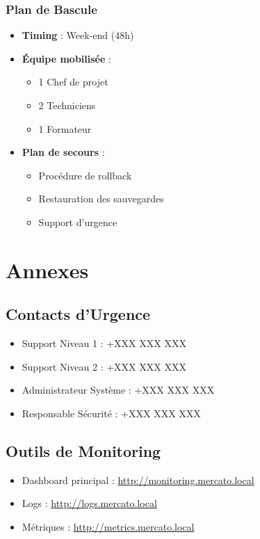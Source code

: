 \documentclass[14pt,a4paper]{report}
\begin{document}
\subsection{Plan de Bascule}
\begin{itemize}
    \item \textbf{Timing} : Week-end (48h)
    \item \textbf{Équipe mobilisée} :
        \begin{itemize}
            \item 1 Chef de projet
            \item 2 Techniciens
            \item 1 Formateur
        \end{itemize}
    \item \textbf{Plan de secours} :
        \begin{itemize}
            \item Procédure de rollback
            \item Restauration des sauvegardes
            \item Support d'urgence
        \end{itemize}
\end{itemize}

\chapter{Annexes}

\section{Contacts d'Urgence}
\begin{itemize}
    \item Support Niveau 1 : +XXX XXX XXX
    \item Support Niveau 2 : +XXX XXX XXX
    \item Administrateur Système : +XXX XXX XXX
    \item Responsable Sécurité : +XXX XXX XXX
\end{itemize}

\section{Outils de Monitoring}
\begin{itemize}
    \item Dashboard principal : \url{http://monitoring.mercato.local}
    \item Logs : \url{http://logs.mercato.local}
    \item Métriques : \url{http://metrics.mercato.local}
\end{itemize}
\end{document}

